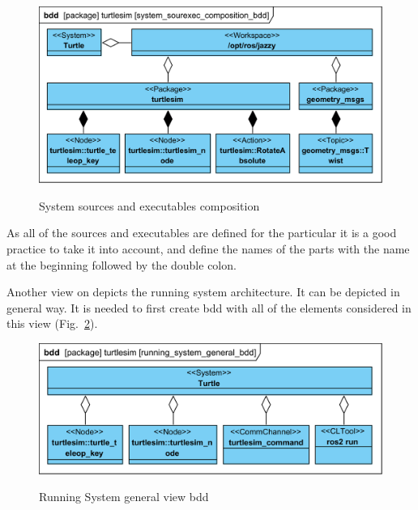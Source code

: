 \documentclass[11pt,oneside,a4paper]{report}
\begin{document}
\begin{figure}[H]
	\centering
	\begin{center}
		{\includegraphics[scale=.9]{diagrams/system_sourexec_composition_bdd.png}}
	\end{center}
	\caption{System sources and executables composition}
	\label{fig:system_sourexec_composition_bdd}
\end{figure}

As all of the sources and executables are defined for the particular \stPackage{} it is a good practice to take it into account, and define the names of the \stPackage{} parts with the \stPackage{} name at the beginning followed by the double colon. 

Another view on \stSystem{} depicts the running system architecture. It can be depicted in general way. It is needed to first create bdd with all of the elements considered in this view (Fig.~\ref{fig:running_system_general_bdd}).
			
\begin{figure}[H]
	\centering
	\begin{center}
		{\includegraphics[scale=.9]{diagrams/running_system_general_bdd.png}}
	\end{center}
	\caption{Running System general view bdd}
	\label{fig:running_system_general_bdd}
\end{figure}
\end{document}
